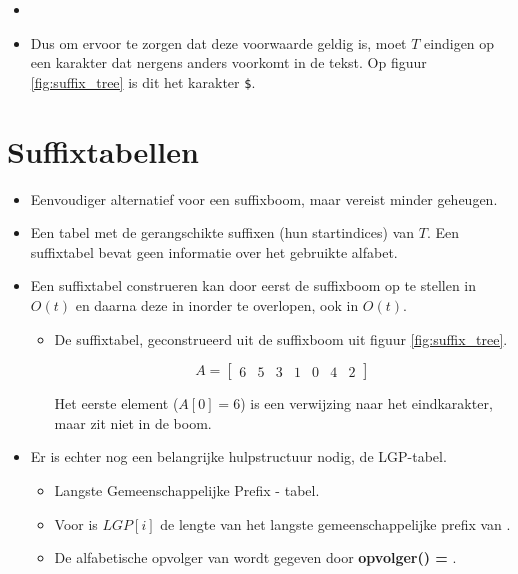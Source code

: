 \begin{itemize}
\begin{itemize}
        \item {}
        \item Dus om ervoor te zorgen dat deze voorwaarde geldig is, moet $T$ eindigen op een karakter dat nergens anders voorkomt in de tekst. Op figuur \ref{fig:suffix_tree} is dit het karakter \texttt{\$}.
    \end{itemize}
\end{itemize}



\section{Suffixtabellen}
\begin{itemize}
    \item Eenvoudiger alternatief voor een suffixboom, maar vereist minder geheugen.
    \item Een tabel met de gerangschikte suffixen (hun startindices) van $T$.
    \alert Een suffixtabel bevat geen informatie over het gebruikte alfabet.
    \item Een suffixtabel construeren kan door eerst de suffixboom op te stellen in $O(t)$ en daarna deze in inorder te overlopen, ook in $O(t)$.
    \begin{itemize}
        \item De suffixtabel, geconstrueerd uit de suffixboom uit figuur \ref{fig:suffix_tree}.

    $$A = \begin{bmatrix}6 & 5 & 3 & 1 & 0 & 4 & 2\end{bmatrix}$$

        Het eerste element ($A[0] = 6$) is een verwijzing naar het eindkarakter, maar zit niet in de boom.
    \end{itemize}
    \item Er is echter nog een belangrijke hulpstructuur nodig, de LGP-tabel.
    \begin{itemize}
        \item Langste Gemeenschappelijke Prefix - tabel.
        \item Voor  is $LGP[i]$ de lengte van het langste gemeenschappelijke prefix van .
        \item De alfabetische opvolger van  wordt gegeven door \textbf{opvolger() = }.
    \end{itemize}


\end{itemize}
